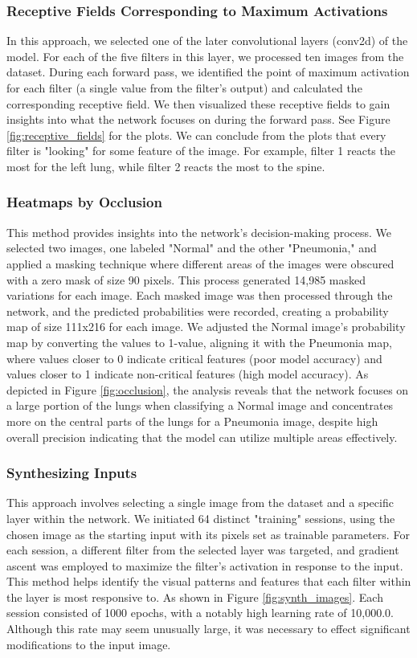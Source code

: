 \documentclass{article}
\begin{document}
\subsubsection{Receptive Fields Corresponding to Maximum Activations}
In this approach, we selected one of the later convolutional layers (conv2d) of the model. For each of the five filters in this layer, we processed ten images from the dataset. During each forward pass, we identified the point of maximum activation for each filter (a single value from the filter's output) and calculated the corresponding receptive field. We then visualized these receptive fields to gain insights into what the network focuses on during the forward pass. See Figure \ref{fig:receptive_fields} for the plots. We can conclude from the plots that every filter is "looking" for some feature of the image. For example, filter 1 reacts the most for the left lung, while filter 2 reacts the most to the spine.

\subsubsection{Heatmaps by Occlusion}
This method provides insights into the network's decision-making process. We selected two images, one labeled "Normal" and the other "Pneumonia," and applied a masking technique where different areas of the images were obscured with a zero mask of size 90 pixels. This process generated 14,985 masked variations for each image. Each masked image was then processed through the network, and the predicted probabilities were recorded, creating a probability map of size 111x216 for each image. We adjusted the Normal image's probability map by converting the values to 1-value, aligning it with the Pneumonia map, where values closer to 0 indicate critical features (poor model accuracy) and values closer to 1 indicate non-critical features (high model accuracy). As depicted in Figure \ref{fig:occlusion}, the analysis reveals that the network focuses on a large portion of the lungs when classifying a Normal image and concentrates more on the central parts of the lungs for a Pneumonia image, despite high overall precision indicating that the model can utilize multiple areas effectively.

\subsubsection{Synthesizing Inputs}
This approach involves selecting a single image from the dataset and a specific layer within the network. We initiated 64 distinct "training" sessions, using the chosen image as the starting input with its pixels set as trainable parameters. For each session, a different filter from the selected layer was targeted, and gradient ascent was employed to maximize the filter's activation in response to the input. This method helps identify the visual patterns and features that each filter within the layer is most responsive to. As shown in Figure \ref{fig:synth_images}. Each session consisted of 1000 epochs, with a notably high learning rate of 10,000.0. Although this rate may seem unusually large, it was necessary to effect significant modifications to the input image.
\end{document}
